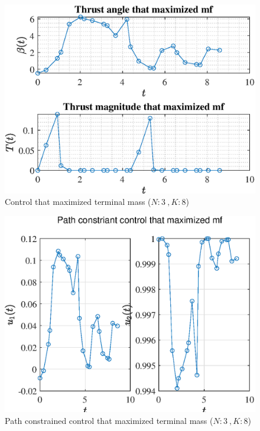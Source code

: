 \documentclass[]{article}
\begin{document}
	\begin{figure}
		\centering
		\includegraphics[scale=0.75]{control_N3_K8_C3_mf.eps}
		\caption{Control that maximized terminal mass (\(N:3\ , K:8\))}
		\label{fig:control_N3_K8_C3_mf}
	\end{figure}
	\begin{figure}
		\centering
		\includegraphics[scale=0.75]{path_N3_K8_C3_mf.eps}
		\caption{Path constrained control that maximized terminal mass (\(N:3\ , K:8\))}
		\label{fig:path_N3_K8_C3_mf}
	\end{figure}
\end{document}
